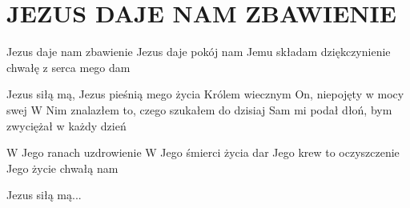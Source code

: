 \documentclass[../../../songbook.tex]{subfiles}
\begin{document}
\TabPositions{9cm} %
\section*{JEZUS DAJE NAM ZBAWIENIE}
{}
\vspace{0.5cm}
Jezus daje nam zbawienie	 \newline	
Jezus daje pokój nam \newline
Jemu składam dziękczynienie \newline
chwałę z serca mego dam \newline

\-\hspace{1cm} Jezus siłą mą, Jezus pieśnią mego życia		 \newline
\-\hspace{1cm} Królem wiecznym On, niepojęty w mocy swej \newline
\-\hspace{1cm} W Nim znalazłem to, czego szukałem do dzisiaj \newline
\-\hspace{1cm} Sam mi podał dłoń, bym zwyciężał w każdy dzień \newline

W Jego ranach uzdrowienie \newline
W Jego śmierci życia dar \newline
Jego krew to oczyszczenie \newline
Jego życie chwałą nam \newline

\-\hspace{1cm} Jezus siłą mą... \newline
\end{document}
